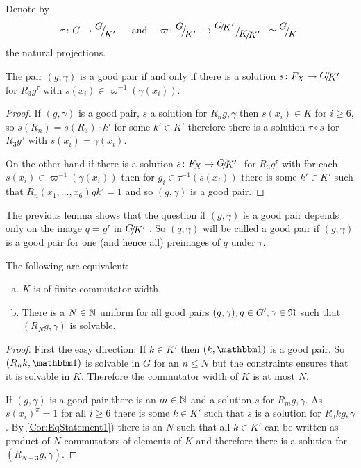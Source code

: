 \documentclass[a4paper,12pt]{article}
\begin{document}
\begin{lem}
 Denote by 
 \[\tau\colon G\to\RNK{G}{K'}\quad\text{ and }\quad\varpi\colon \RNK{G}{K'} \to \RNK{\RNK{G}{K'}}{\RNK{K}{K'}}\simeq \RNK{G}{K}\]
 the natural projections.
 
 The pair $(g,\gamma)$ is a good pair if and only if there is a solution $s\colon F_X \to \RNK{G}{K'}$ for $R_3g^\tau$ with $s(x_i) \in \varpi^{-1}(\gamma(x_i))$. 
\end{lem}
\begin{proof}
 If $(g,\gamma)$ is a good pair, $s$ a solution for $R_ng,\gamma$ then $s(x_i)\in K$ for $i\geq6$, so $s(R_n) = s(R_3) \cdot k'$ for some $k'\in K'$ 
 therefore there is a solution $\tau\circ s$ for $R_3g^\tau$ with $s(x_i) = \gamma(x_i)$.
 
 On the other hand if there is a solution $s\colon F_X \to \RNK{G}{K'}$ for $R_3g^\tau$ with for each $s(x_i) \in \varpi^{-1}(\gamma(x_i))$ then
 for $g_i \in \tau^{-1}(s(x_i))$ there is some $k'\in K'$ such that $R_n(x_1,\ldots,x_6)gk'=1$ and so $(g,\gamma)$ is a good pair.
\end{proof}
The previous lemma shows that the question if $(g,\gamma)$ is a good pair depends only on the image $q=g^\tau$ in $\RNK{G}{K'}$. So 
$(q,\gamma)$ will be called a good pair if $(g,\gamma)$ is a good pair for one (and hence all) preimages of $q$ under $\tau$.
\begin{cor}\label{cor:finiteCommutatorWidthKimpliesBoundedConstraintedCommutators}
The following are equivalent:
\begin{enumerate}[a)]
 \item $K$ is of finite commutator width. \label{Cor:EqStatement1}
 \item There is a $N\in\mathbb{N}$ uniform for all good pairs $(g,\gamma),g \in G',\gamma\in\mathfrak{R}$ such that $(R_Ng,\gamma)$ is solvable.
\end{enumerate}
\end{cor}
\begin{proof}
 First the easy direction: If $k\in K'$ then $(k,\id)$ is a good pair. So $(R_nk,\id)$ is solvable in $G$ for an $n\leq N$ but the constraints ensures that it is solvable in $K$.
 Therefore the commutator width of $K$ is at most $N$.
 
 If $(g,\gamma)$ is a good pair there is an $m\in \mathbb{N}$ and a solution $s$ for $R_mg,\gamma$. As $s(x_i)^\pi =1$ for all $i\geq 6$ there is some $k\in K'$ such that $s$ is 
 a solution for $R_3kg,\gamma$. By \ref{Cor:EqStatement1}) there is an $N$ such that all $k\in K'$ can be written as product of $N$ commutators of elements of $K$ and
 therefore there is a solution for $(R_{N+3}g,\gamma)$.
\end{proof}
\end{document}
